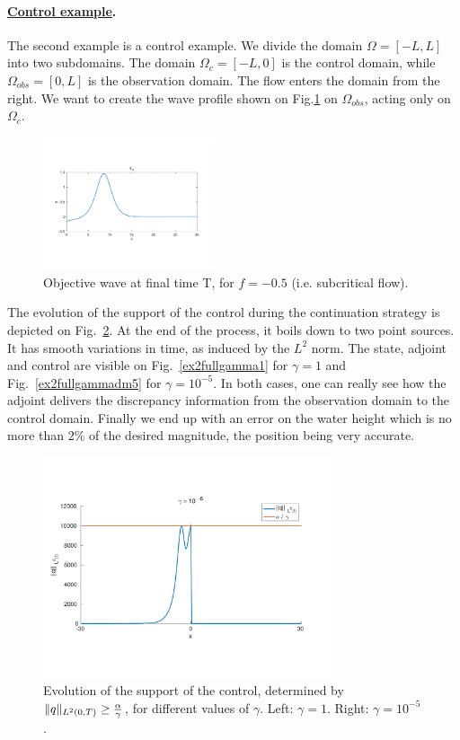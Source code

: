 \paragraph{\underline{Control example}.}
The second example is a control example. We divide the domain $\Omega = [-L,L]$ into two subdomains. The domain $\Omega_c = [-L,0]$ is the control domain, while $\Omega_{obs} = [0,L]$ is the observation domain. The flow enters the domain from the right. We want to create the wave profile shown on Fig.\ref{objectivewave} on $\Omega_{obs}$, acting only on $\Omega_c$.
\begin{figure}[!h]
\includegraphics[width = 0.45\textwidth]{images/ex2yd.pdf}
\caption{Objective wave at final time T, for $f = -0.5$ (i.e. subcritical flow).}
\label{objectivewave}
\end{figure}
The evolution of the support of the control during the continuation strategy is depicted on Fig.~\ref{supportIP}. At the end of the process, it boils down to two point sources. It has smooth variations in time, as induced by the $L^2$ norm. The state, adjoint and control are visible on Fig.~\ref{ex2fullgamma1} for $\gamma = 1$ and Fig.~\ref{ex2fullgammadm5} for $\gamma = 10^{-5}$. In both cases, one can really see how the adjoint delivers the discrepancy information from the observation domain to the control domain. Finally we end up with an error on the water height which is no more than $2\%$ of the desired magnitude, the position being very accurate.
\begin{figure}[!h]
\includegraphics[width = 0.75\textwidth]{images/ex2gammadm5.pdf}
\caption{Evolution of the support of the control, determined by $\lVert q\rVert_{L^2(0,T)}\geq \frac{\alpha}{\gamma}$, for different values of $\gamma$. Left: $\gamma = 1$. Right: $\gamma = 10^{-5}$.}
\label{supportIP}
\end{figure}


